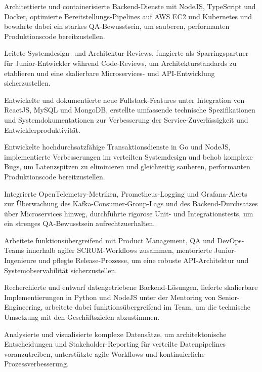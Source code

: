 \documentclass[10pt,a4paper]{resume}
\begin{document}
\bullets
  \item Architettierte und containerisierte Backend-Dienste mit NodeJS, TypeScript und Docker, optimierte Bereitstellungs-Pipelines auf AWS EC2 und Kubernetes und bewahrte dabei ein starkes QA-Bewusstsein, um sauberen, performanten Produktionscode bereitzustellen.
  \item Leitete Systemdesign- und Architektur-Reviews, fungierte als Sparringspartner für Junior-Entwickler während Code-Reviews, um Architekturstandards zu etablieren und eine skalierbare Microservices- und API-Entwicklung sicherzustellen.
  \item Entwickelte und dokumentierte neue Fullstack-Features unter Integration von ReactJS, MySQL und MongoDB, erstellte umfassende technische Spezifikationen und Systemdokumentationen zur Verbesserung der Service-Zuverlässigkeit und Entwicklerproduktivität.
\bulletsend
\vspace{1.5pt}
\bullets
  \item Entwickelte hochdurchsatzfähige Transaktionsdienste in Go und NodeJS, implementierte Verbesserungen im verteilten Systemdesign und behob komplexe Bugs, um Latenzspitzen zu eliminieren und gleichzeitig sauberen, performanten Produktionscode bereitzustellen.
  \item Integrierte OpenTelemetry-Metriken, Prometheus-Logging und Grafana-Alerts zur Überwachung des Kafka-Consumer-Group-Lags und des Backend-Durchsatzes über Microservices hinweg, durchführte rigorose Unit- und Integrationstests, um ein strenges QA-Bewusstsein aufrechtzuerhalten.
  \item Arbeitete funktionsübergreifend mit Product Management, QA und DevOps-Teams innerhalb agiler SCRUM-Workflows zusammen, mentorierte Junior-Ingenieure und pflegte Release-Prozesse, um eine robuste API-Architektur und Systemobservabilität sicherzustellen.
\bulletsend
\vspace{1.5pt}
\bullets
  \item Recherchierte und entwarf datengetriebene Backend-Lösungen, lieferte skalierbare Implementierungen in Python und NodeJS unter der Mentoring von Senior-Engineering, arbeitete dabei funktionsübergreifend im Team, um die technische Umsetzung mit den Geschäftszielen abzustimmen.
  \item Analysierte und visualisierte komplexe Datensätze, um architektonische Entscheidungen und Stakeholder-Reporting für verteilte Datenpipelines voranzutreiben, unterstützte agile Workflows und kontinuierliche Prozessverbesserung.
\bulletsend
\vspace{1.5pt}
\end{document}
